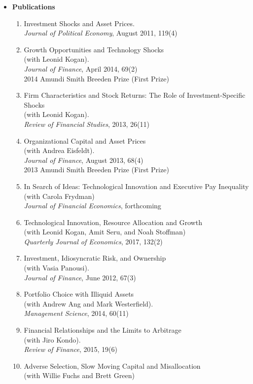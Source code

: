 \documentclass[12pt,letterpaper,serif,overlapped]{res}
\begin{document}
\begin{resume}
\begin{itemize}
\item \textbf{Publications}
\begin{enumerate}
\item Investment Shocks and Asset Prices.\\
\emph{Journal of Political Economy},  August 2011, 119(4)
\item Growth Opportunities and Technology Shocks\\ (with Leonid Kogan).\\
\emph{Journal of Finance}, April 2014, 69(2)\\
 2014 Amundi Smith Breeden Prize (First Prize)
\item Firm Characteristics and Stock Returns: The Role of Investment-Specific Shocks\\ (with Leonid Kogan).\\
\emph{Review of Financial Studies}, 2013, 26(11)
\item Organizational Capital and Asset Prices\\ (with Andrea Eisfeldt).\\
\emph{Journal of Finance}, August 2013, 68(4)\\
 2013 Amundi Smith Breeden Prize (First Prize)
\item In Search of Ideas: Technological Innovation and Executive Pay Inequality\\ (with Carola Frydman)\\
\emph{Journal of Financial Economics}, forthcoming
\item Technological Innovation, Resource Allocation and Growth\\ (with Leonid Kogan, Amit Seru, and Noah Stoffman)\\
\emph{Quarterly Journal of Economics}, 2017, 132(2)
\item Investment, Idiosyncratic Risk, and Ownership\\ (with Vasia Panousi).\\
\emph{Journal of Finance}, June 2012, 67(3)
\item Portfolio Choice with Illiquid Assets\\ (with Andrew Ang and Mark Westerfield).\\
\emph{Management Science},  2014, 60(11)
\item Financial Relationships and the Limits to Arbitrage\\ (with Jiro Kondo).\\
\emph{Review of Finance}, 2015, 19(6)
\item Adverse Selection, Slow Moving Capital and Misallocation\\ (with Willie Fuchs and Brett Green)\\

\end{enumerate}
\end{itemize}
\end{resume}
\end{document}
